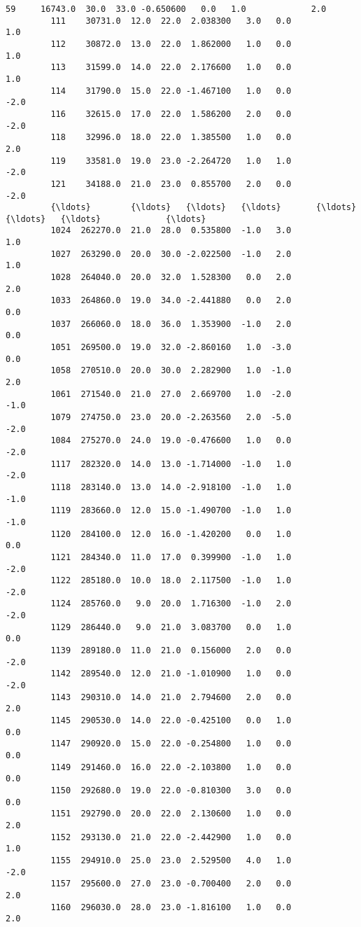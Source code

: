 \documentclass[11pt]{article}
\begin{document}
\begin{Verbatim}[commandchars=\\\{\}]
         59     16743.0  30.0  33.0 -0.650600   0.0   1.0             2.0   
         111    30731.0  12.0  22.0  2.038300   3.0   0.0             1.0   
         112    30872.0  13.0  22.0  1.862000   1.0   0.0             1.0   
         113    31599.0  14.0  22.0  2.176600   1.0   0.0             1.0   
         114    31790.0  15.0  22.0 -1.467100   1.0   0.0            -2.0   
         116    32615.0  17.0  22.0  1.586200   2.0   0.0            -2.0   
         118    32996.0  18.0  22.0  1.385500   1.0   0.0             2.0   
         119    33581.0  19.0  23.0 -2.264720   1.0   1.0            -2.0   
         121    34188.0  21.0  23.0  0.855700   2.0   0.0            -2.0   
         {\ldots}        {\ldots}   {\ldots}   {\ldots}       {\ldots}   {\ldots}   {\ldots}             {\ldots}   
         1024  262270.0  21.0  28.0  0.535800  -1.0   3.0             1.0   
         1027  263290.0  20.0  30.0 -2.022500  -1.0   2.0             1.0   
         1028  264040.0  20.0  32.0  1.528300   0.0   2.0             2.0   
         1033  264860.0  19.0  34.0 -2.441880   0.0   2.0             0.0   
         1037  266060.0  18.0  36.0  1.353900  -1.0   2.0             0.0   
         1051  269500.0  19.0  32.0 -2.860160   1.0  -3.0             0.0   
         1058  270510.0  20.0  30.0  2.282900   1.0  -1.0             2.0   
         1061  271540.0  21.0  27.0  2.669700   1.0  -2.0            -1.0   
         1079  274750.0  23.0  20.0 -2.263560   2.0  -5.0            -2.0   
         1084  275270.0  24.0  19.0 -0.476600   1.0   0.0            -2.0   
         1117  282320.0  14.0  13.0 -1.714000  -1.0   1.0            -2.0   
         1118  283140.0  13.0  14.0 -2.918100  -1.0   1.0            -1.0   
         1119  283660.0  12.0  15.0 -1.490700  -1.0   1.0            -1.0   
         1120  284100.0  12.0  16.0 -1.420200   0.0   1.0             0.0   
         1121  284340.0  11.0  17.0  0.399900  -1.0   1.0            -2.0   
         1122  285180.0  10.0  18.0  2.117500  -1.0   1.0            -2.0   
         1124  285760.0   9.0  20.0  1.716300  -1.0   2.0            -2.0   
         1129  286440.0   9.0  21.0  3.083700   0.0   1.0             0.0   
         1139  289180.0  11.0  21.0  0.156000   2.0   0.0            -2.0   
         1142  289540.0  12.0  21.0 -1.010900   1.0   0.0            -2.0   
         1143  290310.0  14.0  21.0  2.794600   2.0   0.0             2.0   
         1145  290530.0  14.0  22.0 -0.425100   0.0   1.0             0.0   
         1147  290920.0  15.0  22.0 -0.254800   1.0   0.0             0.0   
         1149  291460.0  16.0  22.0 -2.103800   1.0   0.0             0.0   
         1150  292680.0  19.0  22.0 -0.810300   3.0   0.0             0.0   
         1151  292790.0  20.0  22.0  2.130600   1.0   0.0             2.0   
         1152  293130.0  21.0  22.0 -2.442900   1.0   0.0             1.0   
         1155  294910.0  25.0  23.0  2.529500   4.0   1.0            -2.0   
         1157  295600.0  27.0  23.0 -0.700400   2.0   0.0             2.0   
         1160  296030.0  28.0  23.0 -1.816100   1.0   0.0             2.0   
         

\end{Verbatim}
\end{document}
